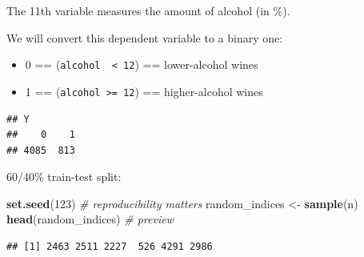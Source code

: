 \documentclass[10pt,b5paper,krantz1]{krantz}
\newenvironment{Shaded}{\begin{snugshade}}{\end{snugshade}}
\newcommand{\CommentTok}[1]{\textcolor[rgb]{0.37,0.37,0.37}{\textit{#1}}}
\newcommand{\DecValTok}[1]{\textcolor[rgb]{0.06,0.06,0.06}{#1}}
\newcommand{\FloatTok}[1]{\textcolor[rgb]{0.06,0.06,0.06}{#1}}
\newcommand{\KeywordTok}[1]{\textcolor[rgb]{0.27,0.27,0.27}{\textbf{#1}}}
\newcommand{\NormalTok}[1]{#1}
\newcommand{\OperatorTok}[1]{\textcolor[rgb]{0.43,0.43,0.43}{\textbf{#1}}}
\newcommand{\StringTok}[1]{\textcolor[rgb]{0.5,0.5,0.5}{#1}}
\providecommand{\tightlist}{%
  \setlength{\itemsep}{0pt}\setlength{\parskip}{0pt}}
\begin{document}
The 11th variable measures the amount of alcohol (in \%).

We will convert this dependent variable to a binary one:

\begin{itemize}
\tightlist
\item
  0 == (\texttt{alcohol\ \ \textless{}\ 12}) == lower-alcohol wines
\item
  1 == (\texttt{alcohol\ \textgreater{}=\ 12}) == higher-alcohol wines
\end{itemize}

\begin{Shaded}
\end{Shaded}

\begin{verbatim}
## Y
##    0    1 
## 4085  813
\end{verbatim}

60/40\% train-test split:

\begin{Shaded}
\begin{Highlighting}[]
\KeywordTok{set.seed}\NormalTok{(}\DecValTok{123}\NormalTok{) }\CommentTok{# reproducibility matters}
\NormalTok{random_indices <-}\StringTok{ }\KeywordTok{sample}\NormalTok{(n)}
\KeywordTok{head}\NormalTok{(random_indices) }\CommentTok{# preview}
\end{Highlighting}
\end{Shaded}

\begin{verbatim}
## [1] 2463 2511 2227  526 4291 2986
\end{verbatim}

\begin{Shaded}
\end{Shaded}
\end{document}
